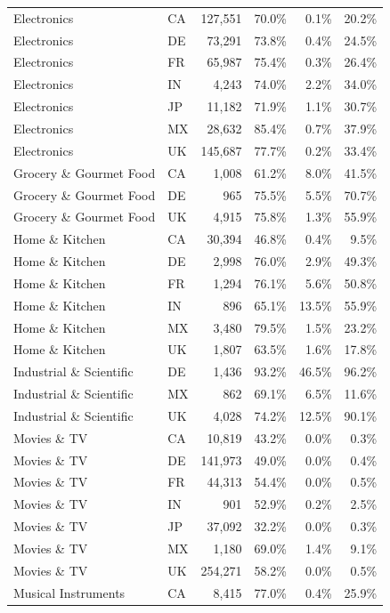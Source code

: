 \begin{longtable}{llrrrr}
Electronics & CA & 127,551 & 70.0\% & 0.1\% & 20.2\% \\
Electronics & DE & 73,291 & 73.8\% & 0.4\% & 24.5\% \\
Electronics & FR & 65,987 & 75.4\% & 0.3\% & 26.4\% \\
Electronics & IN & 4,243 & 74.0\% & 2.2\% & 34.0\% \\
Electronics & JP & 11,182 & 71.9\% & 1.1\% & 30.7\% \\
Electronics & MX & 28,632 & 85.4\% & 0.7\% & 37.9\% \\
Electronics & UK & 145,687 & 77.7\% & 0.2\% & 33.4\% \\
Grocery \& Gourmet Food & CA & 1,008 & 61.2\% & 8.0\% & 41.5\% \\
Grocery \& Gourmet Food & DE & 965 & 75.5\% & 5.5\% & 70.7\% \\
Grocery \& Gourmet Food & UK & 4,915 & 75.8\% & 1.3\% & 55.9\% \\
Home \& Kitchen & CA & 30,394 & 46.8\% & 0.4\% & 9.5\% \\
Home \& Kitchen & DE & 2,998 & 76.0\% & 2.9\% & 49.3\% \\
Home \& Kitchen & FR & 1,294 & 76.1\% & 5.6\% & 50.8\% \\
Home \& Kitchen & IN & 896 & 65.1\% & 13.5\% & 55.9\% \\
Home \& Kitchen & MX & 3,480 & 79.5\% & 1.5\% & 23.2\% \\
Home \& Kitchen & UK & 1,807 & 63.5\% & 1.6\% & 17.8\% \\
Industrial \& Scientific & DE & 1,436 & 93.2\% & 46.5\% & 96.2\% \\
Industrial \& Scientific & MX & 862 & 69.1\% & 6.5\% & 11.6\% \\
Industrial \& Scientific & UK & 4,028 & 74.2\% & 12.5\% & 90.1\% \\
Movies \& TV & CA & 10,819 & 43.2\% & 0.0\% & 0.3\% \\
Movies \& TV & DE & 141,973 & 49.0\% & 0.0\% & 0.4\% \\
Movies \& TV & FR & 44,313 & 54.4\% & 0.0\% & 0.5\% \\
Movies \& TV & IN & 901 & 52.9\% & 0.2\% & 2.5\% \\
Movies \& TV & JP & 37,092 & 32.2\% & 0.0\% & 0.3\% \\
Movies \& TV & MX & 1,180 & 69.0\% & 1.4\% & 9.1\% \\
Movies \& TV & UK & 254,271 & 58.2\% & 0.0\% & 0.5\% \\
Musical Instruments & CA & 8,415 & 77.0\% & 0.4\% & 25.9\% \\

\end{longtable}
